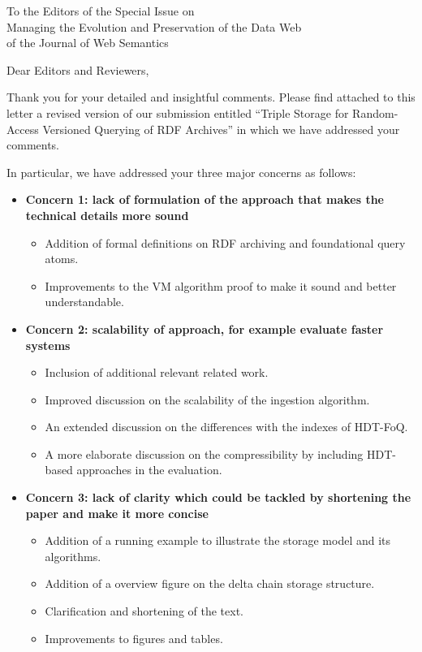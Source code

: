 \documentclass{letter}
\begin{document}
\begin{letter}{To the Editors of the Special Issue on\\Managing the Evolution and Preservation of the Data Web\\of the Journal of Web Semantics}

\opening{Dear Editors and Reviewers,}

\bigskip

Thank you for your detailed and insightful comments.
Please find attached to this letter a revised version of our submission entitled
\enquote{Triple Storage for Random-Access Versioned Querying of RDF Archives}
in which we have addressed your comments.

\bigskip

In particular, we have addressed your three major concerns as follows:
\begin{itemize}
  \item \textbf{Concern 1: lack of formulation of the approach that makes the technical details more sound}
    \begin{itemize}
      \item Addition of formal definitions on RDF archiving and foundational query atoms.
      \item Improvements to the VM algorithm proof to make it sound and better understandable.
    \end{itemize}
  \item \textbf{Concern 2: scalability of approach, for example evaluate faster systems}
    \begin{itemize}
      \item Inclusion of additional relevant related work.
      \item Improved discussion on the scalability of the ingestion algorithm.
      \item An extended discussion on the differences with the indexes of HDT-FoQ.
      \item A more elaborate discussion on the compressibility by including HDT-based approaches in the evaluation.
    \end{itemize}
  \item \textbf{Concern 3: lack of clarity which could be tackled by shortening the paper and make it more concise}
    \begin{itemize}
      \item Addition of a running example to illustrate the storage model and its algorithms.
      \item Addition of a overview figure on the delta chain storage structure.
      \item Clarification and shortening of the text.
      \item Improvements to figures and tables.
    \end{itemize}
\end{itemize}


\end{letter}
\end{document}
